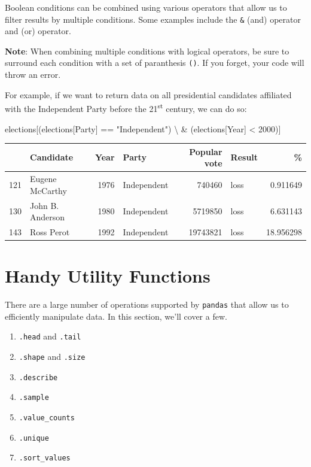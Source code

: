 \documentclass[
  letterpaper,
  DIV=11,
  numbers=noendperiod]{scrreprt}
\newenvironment{Shaded}{\begin{snugshade}}{\end{snugshade}}
\newcommand{\DecValTok}[1]{\textcolor[rgb]{0.68,0.00,0.00}{#1}}
\newcommand{\NormalTok}[1]{\textcolor[rgb]{0.00,0.23,0.31}{#1}}
\newcommand{\OperatorTok}[1]{\textcolor[rgb]{0.37,0.37,0.37}{#1}}
\newcommand{\StringTok}[1]{\textcolor[rgb]{0.13,0.47,0.30}{#1}}
\providecommand{\tightlist}{%
  \setlength{\itemsep}{0pt}\setlength{\parskip}{0pt}}\usepackage{longtable,booktabs,array}
\begin{document}
Boolean conditions can be combined using various operators that allow us
to filter results by multiple conditions. Some examples include the
\texttt{\&} (and) operator and \texttt{\textbar{}} (or) operator.

\textbf{Note}: When combining multiple conditions with logical
operators, be sure to surround each condition with a set of paranthesis
\texttt{()}. If you forget, your code will throw an error.

For example, if we want to return data on all presidential candidates
affiliated with the Independent Party before the 21\textsuperscript{st}
century, we can do so:

\begin{Shaded}
\begin{Highlighting}[]
\NormalTok{elections[(elections[}\StringTok{\textquotesingle{}Party\textquotesingle{}}\NormalTok{] }\OperatorTok{==} \StringTok{"Independent"}\NormalTok{) }\OperatorTok{\textbackslash{}}
          \OperatorTok{\&}\NormalTok{ (elections[}\StringTok{\textquotesingle{}Year\textquotesingle{}}\NormalTok{] }\OperatorTok{\textless{}} \DecValTok{2000}\NormalTok{)]}
\end{Highlighting}
\end{Shaded}

\begin{tabular}{llrlrlr}
\toprule
{} &         Candidate &  Year &        Party &  Popular vote & Result &          \% \\
\midrule
121 &   Eugene McCarthy &  1976 &  Independent &        740460 &   loss &   0.911649 \\
130 &  John B. Anderson &  1980 &  Independent &       5719850 &   loss &   6.631143 \\
143 &        Ross Perot &  1992 &  Independent &      19743821 &   loss &  18.956298 \\
\bottomrule
\end{tabular}

\hypertarget{handy-utility-functions}{%
\section{Handy Utility Functions}\label{handy-utility-functions}}

There are a large number of operations supported by \texttt{pandas} that
allow us to efficiently manipulate data. In this section, we'll cover a
few.

\begin{enumerate}
\def\labelenumi{\arabic{enumi}.}
\tightlist
\item
  \texttt{.head} and \texttt{.tail}
\item
  \texttt{.shape} and \texttt{.size}
\item
  \texttt{.describe}
\item
  \texttt{.sample}
\item
  \texttt{.value\_counts}
\item
  \texttt{.unique}
\item
  \texttt{.sort\_values}
\end{enumerate}
\end{document}
